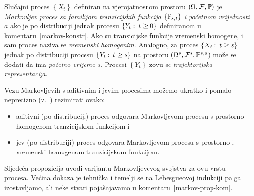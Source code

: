 \documentclass[main.tex]{subfiles}
\begin{document}
\begin{definicija}
	Slučajni proces \( \left\{ X_t \right\} \) definiran na vjerojatnosnom prostoru \( \left( \Omega, \mathcal F, \P \right) \) je \emph{Markovljev proces sa familijom tranzicijskih funkcija} \( \left\{ \Ptrans_{s, t} \right\} \) \emph{i početnom vrijednosti} \( a \) ako je po distribuciji jednak procesu \( \left\{ Y_t \st t \ge 0 \right\} \) definiranom u komentaru~\ref{markov-konstr}. Ako su tranzicijske funkcije vremenski homogene, i sam proces naziva se \emph{vremenski homogenim}. Analogno, za proces
	\( \left\{ X_t \st t \ge s \right\} \) jednak po distribuciji procesu \( \left\{ Y_t \st t \ge s\right\} \)
	na prostoru \( \left( \Omega^s, \mathcal F^s, \P^{s,a} \right) \) može se dodati da ima \emph{početno vrijeme} \( s \). Procesi \( \left\{ Y_t \right\} \) zovu se \emph{trajektorijska reprezentacija}.
\end{definicija}

Vezu Markovljevih s aditivnim i \levy jevim procesima možemo ukratko i pomalo neprecizno
(v.~\cite[]{sato}) rezimirati ovako:
\begin{itemize}
	\item aditivni (po distribuciji) proces odgovara Markovljevom procesu s prostorno homogenom tranzicijskom funkcijom i
	\item \levy jev (po distribuciji) proces odgovara Markovljevom procesu s prostorno i vremenski homogenom tranzicijskom funkcijom.
\end{itemize}

Sljedeća propozicija uvodi varijantu Markovljevevog svojstva za ovu vrstu procesa.
Većina dokaza je tehnička i temelji se na Lebesgueovoj indukciji pa ga izostavljamo,
ali neke stvari pojašnjavamo u komentaru~\ref{markov-prop-kom}.
\end{document}
